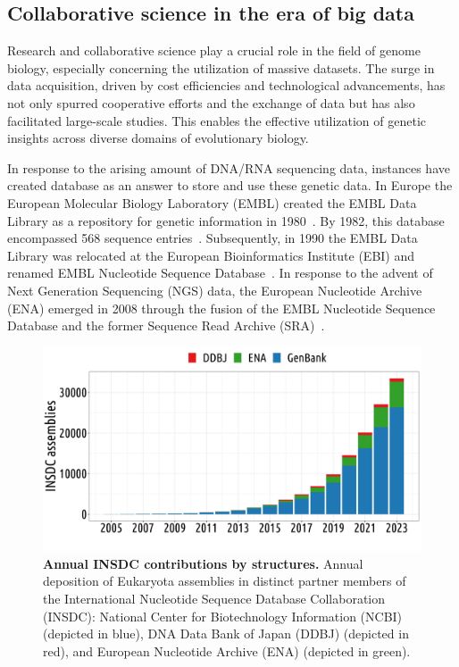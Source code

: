 \subsection{Collaborative science in the era of big data}

Research and collaborative science play a crucial role in the field of genome biology, especially concerning the utilization of massive datasets. The surge in data acquisition, driven by cost efficiencies and technological advancements, has not only spurred cooperative efforts and the exchange of data but has also facilitated large-scale studies. This enables the effective utilization of genetic insights across diverse domains of evolutionary biology.

In response to the arising amount of DNA/RNA sequencing data, instances have created database as an answer to store and use these genetic data. In Europe the European Molecular Biology Laboratory (\acrshort{EMBL}) created the \acrshort{EMBL} Data Library as a repository for genetic information in 1980~\citep{hamm_embl_1986}. By 1982, this database encompassed 568 sequence entries~\citep{kneale_embl_1984}. Subsequently, in 1990 the \acrshort{EMBL} Data Library was relocated at the European Bioinformatics Institute (\acrshort{EBI}) and renamed \acrshort{EMBL} Nucleotide Sequence Database~\citep{rodriguez-tome_european_1996}. In response to the advent of Next Generation Sequencing (NGS) data, the European Nucleotide Archive (\acrshort{ENA}) emerged in 2008 through the fusion of the \acrshort{EMBL} Nucleotide Sequence Database and the former Sequence Read Archive (SRA)~\citep{leinonen_european_2011}.

\begin{figure}[h]
    \centering
    \includegraphics[width=.7\linewidth]{figures/nb_assembly_per_db_insdc.jpg}
    \caption[Annual INSDC contributions by structures]{\textbf{Annual INSDC contributions by structures.} Annual deposition of Eukaryota assemblies in distinct partner members of the International Nucleotide Sequence Database Collaboration (INSDC): National Center for Biotechnology Information (\acrshort{NCBI}) (depicted in blue), DNA Data Bank of Japan (DDBJ) (depicted in red), and European Nucleotide Archive (\acrshort{ENA}) (depicted in green).\newline}
    \label{fig:nbassemblyperdbinsdc}
\end{figure}

